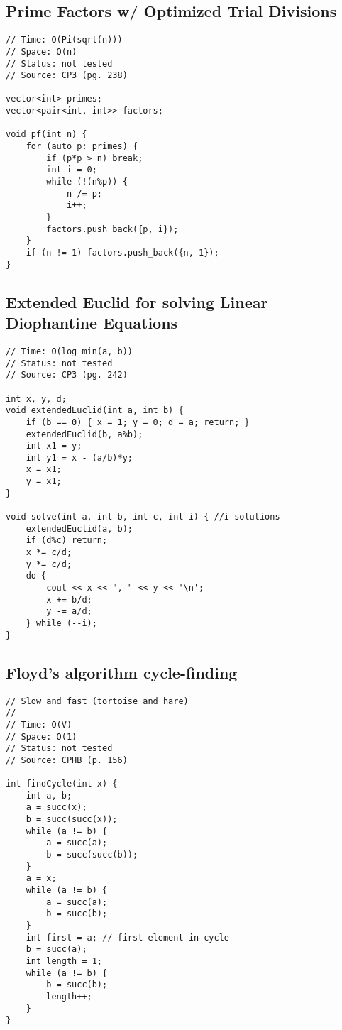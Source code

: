 \documentclass[12pt, a4paper, twoside]{article}
\begin{document}
\subsection{Prime Factors w/ Optimized Trial Divisions}
\begin{lstlisting}
// Time: O(Pi(sqrt(n)))
// Space: O(n)
// Status: not tested
// Source: CP3 (pg. 238)

vector<int> primes;
vector<pair<int, int>> factors;

void pf(int n) {
	for (auto p: primes) {
		if (p*p > n) break;
		int i = 0;
		while (!(n%p)) {
			n /= p;
			i++;
		}
		factors.push_back({p, i});
	}
	if (n != 1) factors.push_back({n, 1});
}
\end{lstlisting}

\subsection{Extended Euclid for solving Linear Diophantine Equations}
\begin{lstlisting}
// Time: O(log min(a, b))
// Status: not tested
// Source: CP3 (pg. 242)

int x, y, d;
void extendedEuclid(int a, int b) {
	if (b == 0) { x = 1; y = 0; d = a; return; }
	extendedEuclid(b, a%b);
	int x1 = y;
	int y1 = x - (a/b)*y;
	x = x1;
	y = x1;
}

void solve(int a, int b, int c, int i) { //i solutions
	extendedEuclid(a, b);
	if (d%c) return;
	x *= c/d;
	y *= c/d;
	do {
		cout << x << ", " << y << '\n';
		x += b/d;
		y -= a/d;
	} while (--i);
}
\end{lstlisting}

\subsection{Floyd's algorithm cycle-finding}
\begin{lstlisting}
// Slow and fast (tortoise and hare)
//
// Time: O(V)
// Space: O(1)
// Status: not tested
// Source: CPHB (p. 156)

int findCycle(int x) {
	int a, b;
	a = succ(x);
	b = succ(succ(x));
	while (a != b) {
		a = succ(a);
		b = succ(succ(b));
	}
	a = x;
	while (a != b) {
		a = succ(a);
		b = succ(b);
	}
	int first = a; // first element in cycle
	b = succ(a);
	int length = 1;
	while (a != b) {
		b = succ(b);
		length++;
	}
}
\end{lstlisting}


\end{document}
